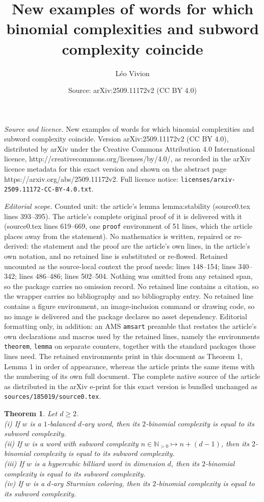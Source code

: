 \documentclass[10pt,a4paper]{amsart}
\title{New examples of words for which binomial complexities and subword complexity coincide}
\author{L\'eo Vivion}
\date{Source: arXiv:2509.11172v2 (CC BY 4.0)}
\newtheorem{theorem}{Theorem}
\newcommand{\N}{\mathbb{N}}
\begin{document}
\maketitle

\noindent\emph{Source and licence.} New examples of words for which binomial complexities and subword complexity coincide. Version arXiv:2509.11172v2 (CC BY 4.0), distributed by arXiv under the Creative Commons Attribution 4.0 International licence, http://creativecommons.org/licenses/by/4.0/, as recorded in the arXiv licence metadata for this exact version and shown on the abstract page https://arxiv.org/abs/2509.11172v2. Full licence notice: \texttt{licenses/arxiv-2509.11172-CC-BY-4.0.txt}.\par\smallskip

\noindent\textit{Editorial scope.} Counted unit: the article's lemma lemma:stability (source0.tex lines 393--395). The article's complete original proof of it is delivered with it (source0.tex lines 619--669, one \texttt{proof} environment of 51 lines, which the article places away from the statement). No mathematics is written, repaired or re-derived: the statement and the proof are the article's own lines, in the article's own notation, and no retained line is substituted or re-flowed.  Retained uncounted as the source-local context the proof needs: lines 148--154; lines 340--342; lines 486--486; lines 502--504.  Nothing was omitted from any retained span, so the package carries no omission record.  No retained line contains a citation, so the wrapper carries no bibliography and no bibliography entry.  No retained line contains a figure environment, an image-inclusion command or drawing code, so no image is delivered and the package declares no asset dependency.  Editorial formatting only, in addition: an AMS \texttt{amsart} preamble that restates the article's own declarations and macros used by the retained lines, namely the environments \texttt{theorem}, \texttt{lemma} on separate counters, together with the standard packages those lines need.  The retained environments print in this document as Theorem 1, Lemma 1 in order of appearance, whereas the article prints the same items with the numbering of its own full document.  The complete native source of the article as distributed in the arXiv e-print for this exact version is bundled unchanged as \texttt{sources/185019/source0.tex}.
\begin{theorem}\label{th:main}
Let $d\geq 2$.\\
\emph{(i)} If $w$ is a $1$-balanced $d$-ary word, then its $2$-binomial complexity is equal to its subword complexity.\\
\emph{(ii)} If $w$ is a word with subword complexity $n\in\N_{>0}\mapsto n+(d-1)$, then its $2$-binomial complexity is equal to its subword complexity.\\
\emph{(iii)} If $w$ is a hypercubic billiard word in dimension $d$, then its $2$-binomial complexity is equal to its subword complexity.\\
\emph{(iv)} If $w$ is a $d$-ary Sturmian coloring, then its $2$-binomial complexity is equal to its subword complexity. 
\end{theorem}
\end{document}
